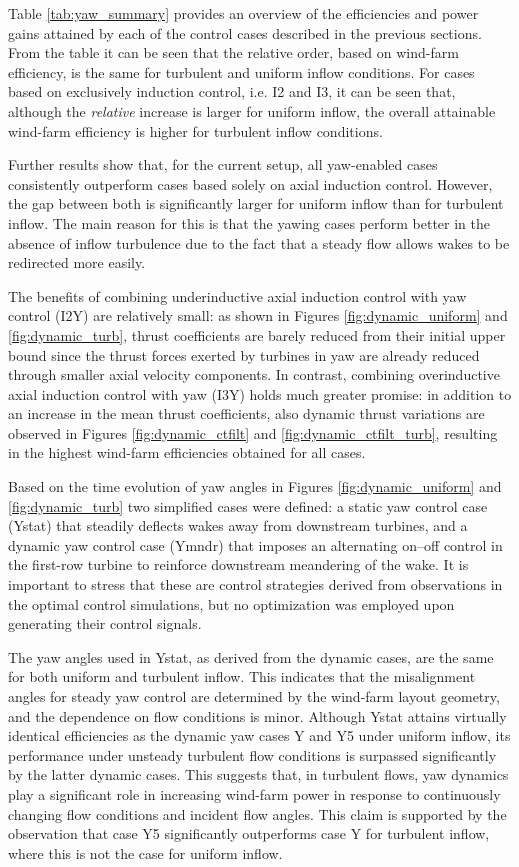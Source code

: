 Table \ref{tab:yaw_summary} provides an overview of the efficiencies and power gains attained by each of the control cases described in the previous sections. From the table it can be seen that the relative order, based on wind-farm efficiency, is the same for turbulent and uniform inflow conditions. For cases based on exclusively induction control, i.e. I2 and I3, it can be seen that, although the \emph{relative} increase is larger for uniform inflow, the overall attainable wind-farm efficiency is higher for turbulent inflow conditions. 

Further results show that, for the current setup, all yaw-enabled cases consistently outperform cases based solely on axial induction control. However, the gap between both is significantly larger for uniform inflow than for turbulent inflow. The main reason for this is that the yawing cases perform better in the absence of inflow turbulence due to the fact that a steady flow allows wakes to be redirected more easily. 

The benefits of combining underinductive axial induction control with yaw control (I2Y) are relatively small: as shown in Figures \ref{fig:dynamic_uniform} and \ref{fig:dynamic_turb}, thrust coefficients are barely reduced from their initial upper bound since the thrust forces exerted by turbines in yaw are already reduced through smaller axial velocity components. In contrast, combining overinductive axial induction control with yaw (I3Y) holds much greater promise: in addition to an increase in the mean thrust coefficients, also dynamic thrust variations are observed in Figures \ref{fig:dynamic_ctfilt} and \ref{fig:dynamic_ctfilt_turb}, resulting in the highest wind-farm efficiencies obtained for all cases. 

Based on the time evolution of yaw angles in Figures \ref{fig:dynamic_uniform} and \ref{fig:dynamic_turb} two simplified cases were defined: a static yaw control case (Ystat) that steadily deflects wakes away from downstream turbines, and a dynamic yaw control case (Ymndr) that imposes an alternating on--off control in the first-row turbine to reinforce downstream meandering of the wake. It is important to stress that these are control strategies derived from observations in the optimal control simulations, but no optimization was employed upon generating their control signals. 

The yaw angles used in Ystat, as derived from the dynamic cases, are the same for both uniform and turbulent inflow. This indicates that the misalignment angles for steady yaw control are determined by the wind-farm layout geometry, and the dependence on flow conditions is minor. Although Ystat attains virtually identical efficiencies as the dynamic yaw cases Y and Y5 under uniform inflow, its performance under unsteady turbulent flow conditions is surpassed significantly by the latter dynamic cases. This suggests that, in turbulent flows, yaw dynamics play a significant role in increasing wind-farm power in response to continuously changing flow conditions and incident flow angles. This claim is supported by the observation that case Y5 significantly outperforms case Y for turbulent inflow, where this is not the case for uniform inflow. 


